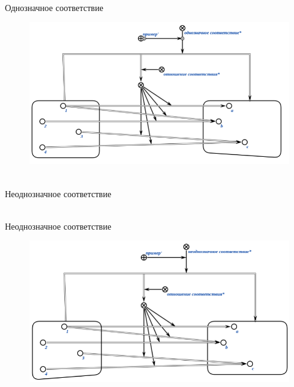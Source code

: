 \documentclass{beamer}
\begin{document}
\begin{frame}{\\Однозначное соответствие}
    \topline
    \begin{center}
        \begin{figure}[Hb]
            \centering
            \includegraphics[scale=.72]{figures/sd_correspondences/One-to-one correspondence.png}
        \end{figure}
    \end{center}
\end{frame}

\begin{frame}{\\Неоднозначное соответствие}
\topline
\begin{SCn}
\end{SCn}
\end{frame}

\begin{frame}{\\Неоднозначное соответствие}
    \topline
    \begin{center}
        \begin{figure}[Hb]
            \centering
            \includegraphics[scale=.72]{figures/sd_correspondences/Ambiguous correspondence.png}
        \end{figure}
    \end{center}
\end{frame}
\end{document}
